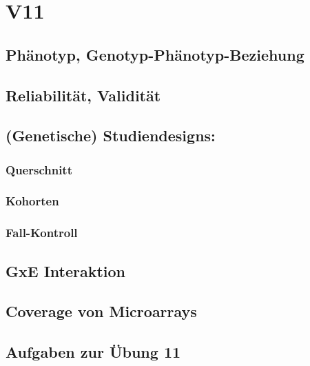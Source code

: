 \section{V11}
\subsection{Phänotyp, Genotyp-Phänotyp-Beziehung}

\subsection{Reliabilität, Validität}

\subsection{(Genetische) Studiendesigns:}

\subsubsection{Querschnitt}

\subsubsection{Kohorten}

\subsubsection{Fall-Kontroll}

\subsection{GxE Interaktion}

\subsection{Coverage von Microarrays}

\subsection{Aufgaben zur Übung 11}